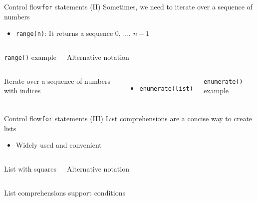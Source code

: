 \documentclass[10pt,compress]{beamer} %
\begin{document}
\begin{frame}{Control flow}{\texttt{for} statements (II)}
	Sometimes, we need to iterate over a sequence of numbers
	\begin{itemize}
		\item \texttt{range(n)}: It returns a sequence $0$, ..., $n-1$
	\end{itemize}

    \begin{columns}
		\begin{exampleblock}{\texttt{range()} example}
		
		\end{exampleblock}
		
		\begin{exampleblock}{Alternative notation}
		
		\end{exampleblock}
	\end{columns}

    \begin{columns}
	    Iterate over a sequence of numbers with indices
	    \begin{itemize}
		    \item \texttt{enumerate(list)}
	    \end{itemize}
		\begin{exampleblock}{\texttt{enumerate()} example}
		
		\end{exampleblock}
	\end{columns}
\end{frame}

\begin{frame}{Control flow}{\texttt{for} statements (III)}
	List comprehensions are a concise way to create lists
	\begin{itemize}
		\item Widely used and convenient
	\end{itemize}

    \begin{columns}
		\begin{exampleblock}{List with squares}
		
		\end{exampleblock}
		
		\begin{exampleblock}{Alternative notation}
		
		\end{exampleblock}
	\end{columns}

    \bigskip

    List comprehensions support conditions

    \begin{columns}
		\begin{exampleblock}{}
		
		\end{exampleblock}
    \end{columns}
\end{frame}
\end{document}
